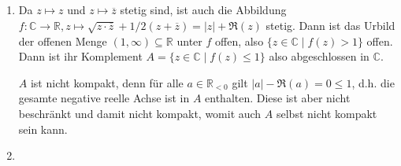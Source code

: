 \documentclass{article}
\def\to{\ensuremath{\rightarrow}} %
\def\R{\ensuremath{\mathbb{R}}}
\def\C{\ensuremath{\mathbb{C}}}
\begin{document}
\subsection{}

\begin{enumerate}
	\item Da $z \mapsto z$ und $z \mapsto \overline{z}$ stetig sind, ist auch die Abbildung $f: \C \to \R, z \mapsto \sqrt{z \cdot \overline{z}} + 1/2 (z + \overline{z}) = |z| + \Re(z)$ stetig. Dann ist das Urbild der offenen Menge $(1, \infty) \subseteq \R$ unter $f$ offen, also $\{z \in \mathds{C} \mid f(z) > 1\}$ offen. Dann ist ihr Komplement $A = \{z \in \mathds{C} \mid f(z) \leq 1\}$ also abgeschlossen in $\mathds{C}$.
	
	$A$ ist nicht kompakt, denn für alle $a \in \mathds{R}_{<0}$ gilt $|a| - \Re(a) = 0 \leq 1$, d.h. die gesamte negative reelle Achse ist in $A$ enthalten. Diese ist aber nicht beschränkt und damit nicht kompakt, womit auch $A$ selbst nicht kompakt sein kann.
	\item 
\end{enumerate}
\end{document}
